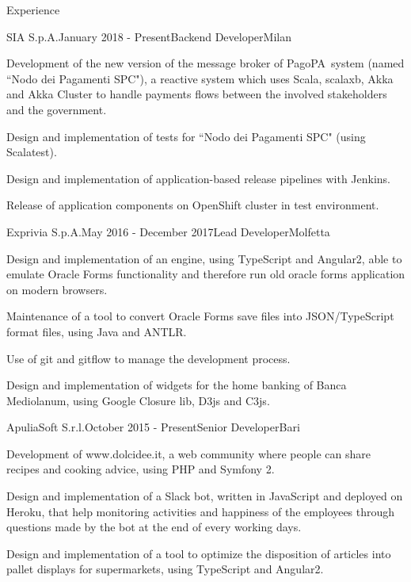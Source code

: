 \documentclass{resume} %
\begin{document}

\begin{rSection}{Experience}

\begin{rSubsection}{SIA S.p.A.}{January 2018 - Present}{Backend Developer}{Milan}
\item Development of the new version of the message broker of PagoPA\textregistered~system (named ``Nodo dei Pagamenti SPC"),
a reactive system which uses Scala, scalaxb, Akka and Akka Cluster to handle payments flows between the involved stakeholders and the government.
\item Design and implementation of tests for ``Nodo dei Pagamenti SPC" (using Scalatest).
\item Design and implementation of application-based release pipelines with Jenkins.
\item Release of application components on OpenShift cluster in test environment.
\end{rSubsection}


\begin{rSubsection}{Exprivia S.p.A.}{May 2016 - December 2017}{Lead Developer}{Molfetta}
\item Design and implementation of an engine, using TypeScript and Angular2,
able to emulate Oracle Forms functionality and therefore run old oracle forms application on modern browsers.
\item Maintenance of a tool to convert Oracle Forms save files into JSON/TypeScript format files, using Java and ANTLR.
\item Use of git and gitflow to manage the development process.
\item Design and implementation of widgets for the home banking of Banca Mediolanum, using Google Closure lib, D3js and C3js.
\end{rSubsection}


\begin{rSubsection}{ApuliaSoft S.r.l.}{October 2015 - Present}{Senior Developer}{Bari}
\item Development of www.dolcidee.it, a web community where people can share recipes and cooking advice, using PHP and Symfony 2.
\item Design and implementation of a Slack bot, written in JavaScript and deployed on Heroku, that help monitoring activities and
happiness of the employees through questions made by the bot at the end of every working days.
\item Design and implementation of a tool to optimize the disposition of articles into pallet displays for supermarkets, using TypeScript and Angular2.
\end{rSubsection}


\end{rSection}
\end{document}
